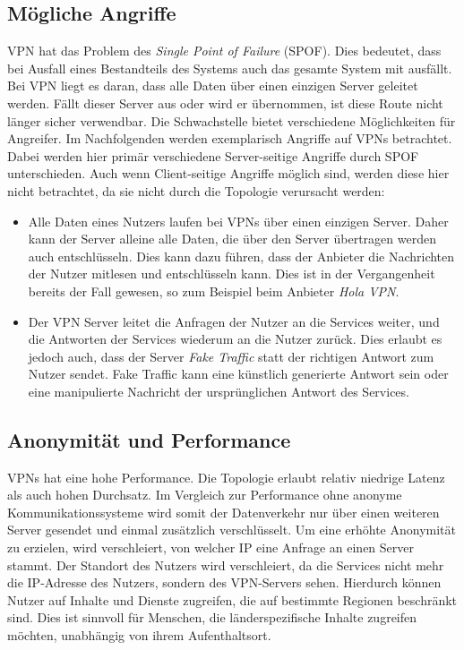 \subsection{Mögliche Angriffe}

VPN hat das Problem des \textit{Single Point of Failure} (SPOF). Dies bedeutet, dass bei Ausfall eines Bestandteils des Systems auch das gesamte System mit ausfällt. Bei VPN liegt es daran, dass alle Daten über einen einzigen Server geleitet werden. Fällt dieser Server aus oder wird er übernommen, ist diese Route nicht länger sicher verwendbar\cite{AttacksOnVPNs}.
Die Schwachstelle bietet verschiedene Möglichkeiten für Angreifer. Im Nachfolgenden werden exemplarisch Angriffe auf VPNs betrachtet. Dabei werden hier primär verschiedene Server-seitige Angriffe durch SPOF unterschieden. Auch wenn Client-seitige Angriffe möglich sind, werden diese hier nicht betrachtet, da sie nicht durch die Topologie verursacht werden:

\begin{itemize}
    \item Alle Daten eines Nutzers laufen bei VPNs über einen einzigen Server. Daher kann der Server alleine alle Daten, die über den Server übertragen werden auch entschlüsseln. Dies kann dazu führen, dass der Anbieter die Nachrichten der Nutzer mitlesen und entschlüsseln kann. Dies ist in der Vergangenheit bereits der Fall gewesen, so zum Beispiel beim Anbieter \textit{Hola VPN}\cite{VPNCriticalSurvey}.
    \item Der VPN Server leitet die Anfragen der Nutzer an die Services weiter, und die Antworten der Services wiederum an die Nutzer zurück. Dies erlaubt es jedoch auch, dass der Server \textit{Fake Traffic} statt der richtigen Antwort zum Nutzer sendet. Fake Traffic kann eine künstlich generierte Antwort sein oder eine manipulierte Nachricht der ursprünglichen Antwort des Services.
\end{itemize}

\subsection{Anonymität und Performance}

VPNs hat eine hohe Performance. Die Topologie erlaubt relativ niedrige Latenz als auch hohen Durchsatz. Im Vergleich zur Performance ohne anonyme Kommunikationssysteme wird somit der Datenverkehr nur über einen weiteren Server gesendet und einmal zusätzlich verschlüsselt.
Um eine erhöhte Anonymität zu erzielen, wird verschleiert, von welcher IP eine Anfrage an einen Server stammt. Der Standort des Nutzers wird verschleiert, da die Services nicht mehr die IP-Adresse des Nutzers, sondern des VPN-Servers sehen. Hierdurch können Nutzer auf Inhalte und Dienste zugreifen, die auf bestimmte Regionen beschränkt sind. Dies ist sinnvoll für Menschen, die länderspezifische Inhalte zugreifen möchten, unabhängig von ihrem Aufenthaltsort.

